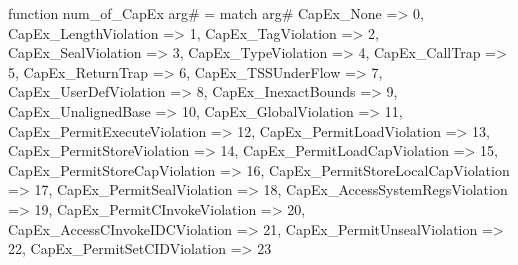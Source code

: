 function num_of_CapEx arg# = match arg# {
  CapEx_None => 0,
  CapEx_LengthViolation => 1,
  CapEx_TagViolation => 2,
  CapEx_SealViolation => 3,
  CapEx_TypeViolation => 4,
  CapEx_CallTrap => 5,
  CapEx_ReturnTrap => 6,
  CapEx_TSSUnderFlow => 7,
  CapEx_UserDefViolation => 8,
  CapEx_InexactBounds => 9,
  CapEx_UnalignedBase => 10,
  CapEx_GlobalViolation => 11,
  CapEx_PermitExecuteViolation => 12,
  CapEx_PermitLoadViolation => 13,
  CapEx_PermitStoreViolation => 14,
  CapEx_PermitLoadCapViolation => 15,
  CapEx_PermitStoreCapViolation => 16,
  CapEx_PermitStoreLocalCapViolation => 17,
  CapEx_PermitSealViolation => 18,
  CapEx_AccessSystemRegsViolation => 19,
  CapEx_PermitCInvokeViolation => 20,
  CapEx_AccessCInvokeIDCViolation => 21,
  CapEx_PermitUnsealViolation => 22,
  CapEx_PermitSetCIDViolation => 23
}
